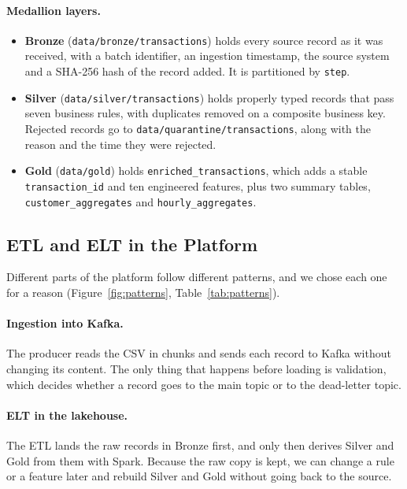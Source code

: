 \documentclass[11pt,a4paper]{article}
\newcommand{\code}[1]{\texttt{#1}}
\begin{document}
\paragraph{Medallion layers.}
\begin{itemize}
  \item \textbf{Bronze} (\code{data/bronze/transactions}) holds every source record
        as it was received, with a batch identifier, an ingestion timestamp, the
        source system and a SHA-256 hash of the record added. It is partitioned by
        \code{step}.
  \item \textbf{Silver} (\code{data/silver/transactions}) holds properly typed
        records that pass seven business rules, with duplicates removed on a
        composite business key. Rejected records go to
        \code{data/quarantine/transactions}, along with the reason and the time
        they were rejected.
  \item \textbf{Gold} (\code{data/gold}) holds \code{enriched\_transactions}, which
        adds a stable \code{transaction\_id} and ten engineered features, plus two
        summary tables, \code{customer\_aggregates} and \code{hourly\_aggregates}.
\end{itemize}

\subsection{ETL and ELT in the Platform}
Different parts of the platform follow different patterns, and we chose each one
for a reason (Figure~\ref{fig:patterns}, Table~\ref{tab:patterns}).

\paragraph{Ingestion into Kafka.} The producer reads the CSV in chunks and sends
each record to Kafka without changing its content. The only thing that happens
before loading is validation, which decides whether a record goes to the main
topic or to the dead-letter topic.

\paragraph{ELT in the lakehouse.} The ETL lands the raw records in Bronze first,
and only then derives Silver and Gold from them with Spark. Because the raw copy
is kept, we can change a rule or a feature later and rebuild Silver and Gold
without going back to the source.
\end{document}
